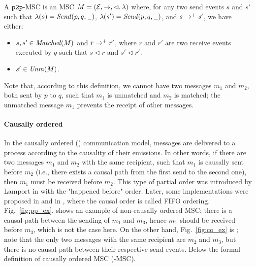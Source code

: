 \begin{definition}\label{def:pp_msc}
	A $\mathtt{p2p}$-MSC is an MSC $M = (\mathcal{E},\to,\lhd,\lambda)$ where, for any two send events $s$ and $s'$ such that $\lambda(s)={\mathit{Send}(p,q,\hspace{0.1em}\underline{\hspace{0.5em}}\hspace{0.1em})}$, $\lambda(s')={\mathit{Send}(p,q,\hspace{0.1em}\underline{\hspace{0.5em}}\hspace{0.1em})}$, and $s \to^+ s'$, we have either:
	\begin{itemize}\itemsep=0.5ex
		\item $s,s' \in \mathit{Matched}(M)$ and $r \to^+ r'$, where $r$ and $r'$ are two receive events executed by $q$ such that $s \lhd r$ and $s' \lhd r'$.
		\item $s' \in \mathit{Unm}(M)$.
	\end{itemize}
	
\end{definition}

Note that, according to this definition, we cannot have two messages $m_1$ and $m_2$, both sent by $p$ to $q$, such that $m_1$ is unmatched and $m_2$ is matched; the unmatched message $m_1$ prevents the receipt of other messages.

\paragraph{\bf Causally ordered}
In the causally ordered (\co) communication model, messages are delivered to a process according to the causality of their emissions. In other words, if there are two messages $m_1$ and $m_2$ with the same recipient, such that $m_1$ is causally sent before $m_2$ (i.e., there exists a causal path from the first send to the second one), then $m_1$ must be received before $m_2$.
This type of partial order was introduced by Lamport in \cite{Lamport78} with the "happened before" order. Later, some implementations were proposed in \cite{peterson1989preserving, DBLP:conf/wdag/SchiperES89, kshemkalyani1998necessary} and in \cite{coulouris2005distributed}, where the causal order is called FIFO ordering.
Fig.~\ref{fig:pp_ex}, shows an example of non-causally ordered MSC; there is a causal path between the sending of $m_1$ and $m_3$, hence $m_1$ should be received before $m_3$, which is not the case here. On the other hand, Fig.~\ref{fig:co_ex} is \co; note that the only two messages with the same recipient are $m_2$ and $m_3$, but there is no causal path between their respective send events. Below the formal definition of causally ordered MSC (\co-MSC).

